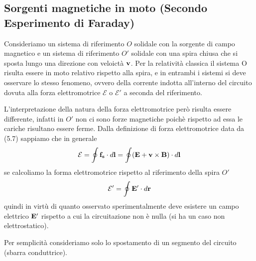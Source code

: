 \subsection{Sorgenti magnetiche  in moto (Secondo Esperimento di Faraday)}

Consideriamo un sistema di riferimento $O$ solidale con la sorgente di campo magnetico e un sistema di riferimento $O'$ solidale con una spira chiusa che si sposta lungo una direzione con veloict\`a $\bold{v}$. Per la relativit\`a  classica il sistema O risulta essere in moto relativo rispetto alla spira, e in entrambi i sistemi si deve osservare lo stesso fenomeno, ovvero della corrente indotta all'interno del circuito dovuta alla forza elettromotrice $\mathcal{E}$ o $\mathcal{E}'$ a seconda del riferimento.

L'interpretazione della natura della forza elettromotrice per\`o  risulta essere differente, infatti in $O'$ non ci sono forze magnetiche poich\`e rispetto ad essa le cariche risultano essere ferme. Dalla definizione di forza elettromotrice data da (5.7) sappiamo che in generale 
\begin{equation*}
	\mathcal{E} = \oint \bold{f_s} \cdot d\bold{l} = \oint (\bold{E} + \bold{v} \times \bold{B}) \cdot d \bold{l}
\end{equation*} 
se calcoliamo la forma elettromotrice rispetto al riferimento della spira $O'$ 
\begin{equation*}
	\mathcal{E}' = \oint \bold{E}' \cdot d\bold{r}
\end{equation*}   
quindi in virt\`u di quanto osservato sperimentalmente deve esistere un campo elettrico $\bold{E}'$ rispetto a cui la circuitazione non \`e nulla (si ha un caso non elettrostatico).

Per semplicit\`a  consideriamo solo lo spostamento di un segmento del circuito (sbarra conduttrice).


